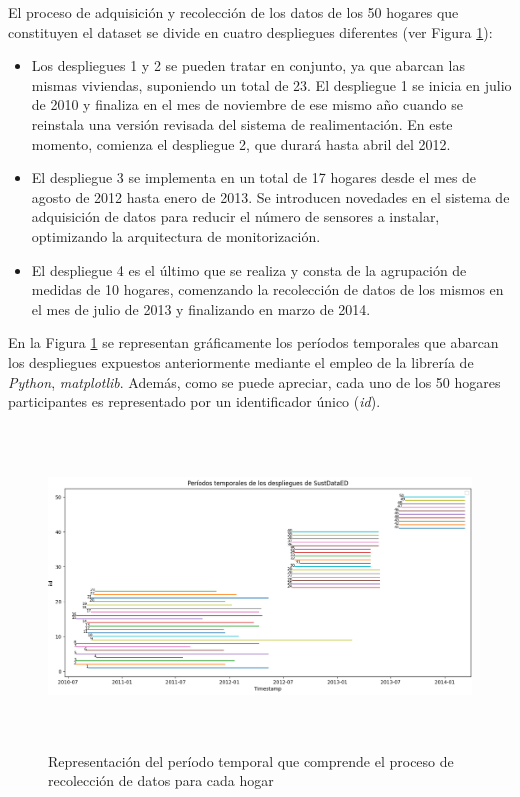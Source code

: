 El proceso de adquisición y recolección de los datos de los 50 hogares que constituyen el dataset se divide en cuatro despliegues diferentes (ver Figura \ref{fig:despliegues}):

\pagebreak

\begin{itemize}
    \item Los despliegues 1 y 2 se pueden tratar en conjunto, ya que abarcan las mismas viviendas, suponiendo un total de 23. El despliegue 1 se inicia en julio de 2010 y finaliza en el mes de noviembre de ese mismo año cuando se reinstala una versión revisada del sistema de realimentación. En este momento, comienza el despliegue 2, que durará hasta abril del 2012.
    \item El despliegue 3 se implementa en un total de 17 hogares desde el mes de agosto de 2012 hasta enero de 2013. Se introducen novedades en el sistema de adquisición de datos para reducir el número de sensores a instalar, optimizando la arquitectura de monitorización. 
    \item El despliegue 4 es el último que se realiza y consta de la agrupación de medidas de 10 hogares, comenzando la recolección de datos de los mismos en el mes de julio de 2013 y finalizando en marzo de 2014.
\end{itemize}

En la Figura \ref{fig:despliegues} se representan gráficamente los períodos temporales que abarcan los despliegues expuestos anteriormente mediante el empleo de la librería de \textit{Python}, \textit{matplotlib}. Además, como se puede apreciar, cada uno de los 50 hogares participantes es representado por un identificador único (\textit{id}). 

\vspace{3mm}

\begin{figure}[h!]
    \centering
    \includegraphics[width=1\textwidth,height=8.5cm]{img/diseno/despliegues.png}
    \caption{Representación del período temporal que comprende el proceso de recolección de datos para cada hogar}
    \label{fig:despliegues}
\end{figure}

